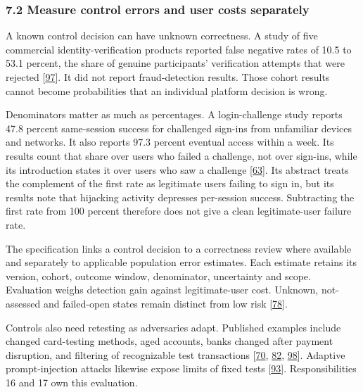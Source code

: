 \documentclass[
  11pt,
]{article}
\begin{document}
\hypertarget{measure-control-errors-and-user-costs-separately}{%
\subsubsection{7.2 Measure control errors and user costs
separately}\label{measure-control-errors-and-user-costs-separately}}

A known control decision can have unknown correctness. A study of five
commercial identity-verification products reported false negative rates
of 10.5 to 53.1 percent, the share of genuine participants' verification
attempts that were rejected
{[}\protect\hyperlink{ref-Fatima2024}{97}{]}. It did not report
fraud-detection results. Those cohort results cannot become
probabilities that an individual platform decision is wrong.

Denominators matter as much as percentages. A login-challenge study
reports 47.8 percent same-session success for challenged sign-ins from
unfamiliar devices and networks. It also reports 97.3 percent eventual
access within a week. Its results count that share over users who failed
a challenge, not over sign-ins, while its introduction states it over
users who saw a challenge
{[}\protect\hyperlink{ref-Doerfler2019}{63}{]}. Its abstract treats the
complement of the first rate as legitimate users failing to sign in, but
its results note that hijacking activity depresses per-session success.
Subtracting the first rate from 100 percent therefore does not give a
clean legitimate-user failure rate.

The specification links a control decision to a correctness review where
available and separately to applicable population error estimates. Each
estimate retains its version, cohort, outcome window, denominator,
uncertainty and scope. Evaluation weighs detection gain against
legitimate-user cost. Unknown, not-assessed and failed-open states
remain distinct from low risk
{[}\protect\hyperlink{ref-Stripe2026PAYG}{78}{]}.

Controls also need retesting as adversaries adapt. Published examples
include changed card-testing methods, aged accounts, banks changed after
payment disruption, and filtering of recognizable test transactions
{[}\protect\hyperlink{ref-Tian2018}{70},
\protect\hyperlink{ref-Thomas2013}{82},
\protect\hyperlink{ref-Meltzer2025}{98}{]}. Adaptive prompt-injection
attacks likewise expose limits of fixed tests
{[}\protect\hyperlink{ref-Nasr2025}{93}{]}. Responsibilities 16 and 17
own this evaluation.
\end{document}
